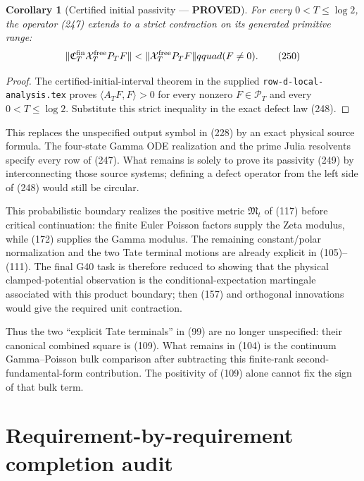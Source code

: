 \documentclass[11pt]{article}
\newtheorem{corollary}[theorem]{Corollary}
\newcommand{\PROVED}{\textcolor{green!45!black}{\textbf{PROVED}}}
\begin{document}
\begin{corollary}[Certified initial passivity --- \PROVED]
For every $0<T\le\log2$, the operator (247) extends to a strict contraction
on its generated primitive range:
\begin{equation}
 \|\mathfrak C_T^{\rm fin}
       \mathcal X_T^{\rm free}P_TF\|
 <\|\mathcal X_T^{\rm free}P_TF\|qquad(F\ne0).       \tag{250}
\end{equation}
\end{corollary}

\begin{proof}
The certified-initial-interval theorem in the supplied
\texttt{row-d-local-analysis.tex} proves
$\langle A_TF,F\rangle>0$ for every nonzero $F\in\mathcal P_T$ and every
$0<T\le\log2$.  Substitute this strict inequality in the exact defect law
(248).
\end{proof}

This replaces the unspecified output symbol in (228) by an exact physical
source formula.  The four-state Gamma ODE realization and the prime Julia
resolvents specify every row of (247).  What remains is solely to prove its
passivity (249) by interconnecting those source systems; defining a defect
operator from the left side of (248) would still be circular.

This probabilistic boundary realizes the positive metric
$\mathfrak M_t$ of (117) before critical continuation: the finite Euler
Poisson factors supply the Zeta modulus, while (172) supplies the Gamma
modulus.  The remaining constant/polar normalization and the two Tate
terminal motions are already explicit in (105)--(111).  The final G40 task
is therefore reduced to showing that the physical clamped-potential
observation is the conditional-expectation martingale associated with this
product boundary; then (157) and orthogonal innovations would give the
required unit contraction.

Thus the two ``explicit Tate terminals'' in (99) are no longer unspecified:
their canonical combined square is (109).  What remains in (104) is the
continuum Gamma--Poisson bulk comparison after subtracting this finite-rank
second-fundamental-form contribution.  The positivity of (109) alone cannot
fix the sign of that bulk term.

\section{Requirement-by-requirement completion audit}
\end{document}
